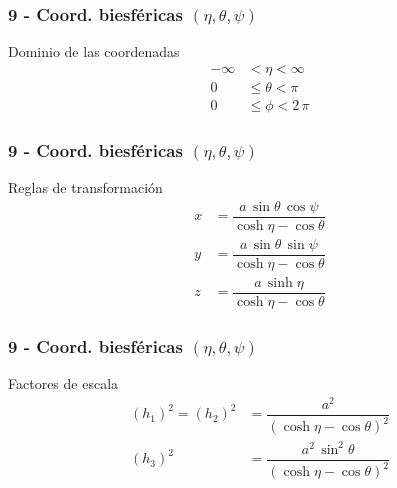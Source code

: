 \documentclass[12pt]{beamer}
\begin{document}
\begin{frame}
\frametitle{9 - Coord. biesféricas $(\eta, \theta, \psi)$}
\fontsize{12}{12}\selectfont
Dominio de las coordenadas
\begin{align*}
-\infty &< \eta < \infty \\
0 &\leq \theta < \pi \\
0 &\leq \phi < 2\, \pi
\end{align*}
\end{frame}
\begin{frame}
\frametitle{9 - Coord. biesféricas $(\eta, \theta, \psi)$}
\fontsize{12}{12}\selectfont
Reglas de transformación
\begin{align*}
x &= \dfrac{a \, \sin \theta \, \cos \psi}{\cosh \eta - \cos \theta} \\[0.5em]
y &= \dfrac{a \, \sin \theta \, \sin \psi}{\cosh \eta - \cos \theta} \\[0.5em]
z &= \dfrac{a \, \sinh \eta}{\cosh \eta - \cos \theta}
\end{align*}
\end{frame}
\begin{frame}
\frametitle{9 - Coord. biesféricas $(\eta, \theta, \psi)$}
\fontsize{12}{12}\selectfont
Factores de escala
\begin{align*}
(h_{1})^{2} = (h_{2})^{2} &= \dfrac{a^{2}}{(\cosh \eta - \cos \theta)^{2}} \\[0.5em]
(h_{3})^{2} &= \dfrac{a^{2} \, \sin^{2} \theta}{(\cosh \eta - \cos \theta)^{2}}
\end{align*}
\end{frame}
\end{document}
